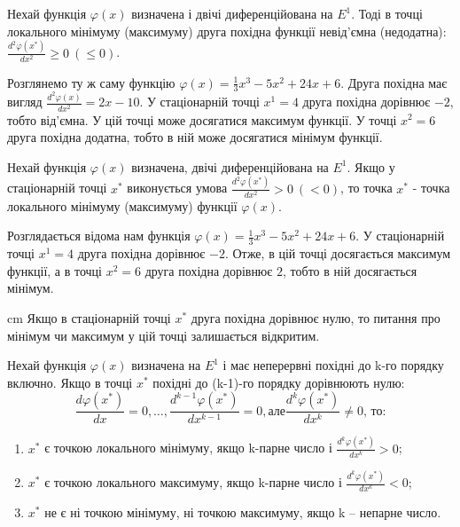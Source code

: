 \documentclass[12pt,a4paper]{article}
\begin{document}
\begin{theorem1}
Нехай функція $\varphi\left(x\right)$ визначена і двічі диференційована на ${E}^1$. Тоді в точці локального мінімуму (максимуму) друга похідна функції невід’ємна (недодатна): $\frac{{d}^2\varphi\left({x}^*\right)}{d{x}^2} \ge 0 \ \left(\le 0\right)$.
\end{theorem1}
\begin{example1}
Розглянемо ту ж саму функцію $\varphi\left(x\right) = \frac{1}{3}{x}^3-5{x}^2+24x+6$. Друга похідна має вигляд $\frac{{d}^2\varphi\left(x\right)}{d{x}^2} = 2x-10$. У стаціонарній точці ${x}^1 = 4$ друга похідна дорівнює $-2$, тобто від’ємна. У цій точці може досягатися максимум функції. У точці ${x}^2 = 6$ друга похідна додатна, тобто в ній може досягатися мінімум функції.
\end{example1}
\begin{theorem2}
Нехай функція $\varphi\left(x\right)$ визначена, двічі диференційована на ${E}^1$. Якщо у стаціонарній точці ${x}^*$ виконується умова $\frac{{d}^2\varphi\left({x}^*\right)}{d{x}^2} > 0 \ \left(< 0\right)$, то точка ${x}^*$ - точка локального мінімуму (максимуму) функції $\varphi\left(x\right)$. 
\end{theorem2}
\begin{example2}
Розглядається відома нам функція $\varphi\left(x\right) = \frac{1}{3}{x}^3-5{x}^2+24x+6$. У стаціонарній точці ${x}^1 = 4$ друга похідна дорівнює $-2$. Отже, в цій точці досягається максимум функції, а в точці ${x}^2 = 6$ друга похідна дорівнює $2$, тобто в ній досягається мінімум.
\end{example2}
\begin{flushleft}
\parbox{14,5 cm}{ cm Якщо в стаціонарній точці ${x}^*$ друга похідна дорівнює нулю, то питання про мінімум чи максимум у цій точці залишається відкритим.}
\end{flushleft}
\begin{theorem3}
Нехай функція $\varphi\left(x\right)$ визначена на ${E}^1$ і має неперервні похідні до k-го порядку включно. Якщо в точці ${x}^*$ похідні до (k-1)-го порядку дорівнюють нулю:
$$\frac{d\varphi\left({x}^*\right)}{dx} = 0, \dots, \frac{{d}^{k-1}\varphi\left({x}^*\right)}{d{x}^{k-1}} = 0, але \frac{{d}^k\varphi\left({x}^*\right)}{d{x}^k}\neq 0\text{, то:}$$
\begin{enumerate}
\item ${x}^*$ є точкою локального мінімуму, якщо k-парне число і $\frac{{d}^k\varphi\left({x}^*\right)}{d{x}^k}>0$;
\item ${x}^*$ є точкою локального максимуму, якщо k-парне число і $\frac{{d}^k\varphi\left({x}^*\right)}{d{x}^k}<0$;
\item ${x}^*$ не є ні точкою мінімуму, ні точкою максимуму, якщо  k – непарне число.
\end{enumerate}
\end{theorem3}
\end{document}
